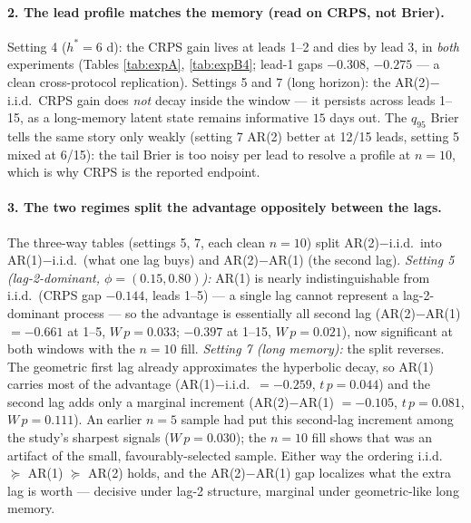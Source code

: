 \documentclass[11pt]{article}
\begin{document}
\paragraph{2. The lead profile matches the memory (read on CRPS, not Brier).}
Setting 4 ($h^\ast = 6$ d): the CRPS gain lives at leads 1--2 and dies by
lead 3, in \emph{both} experiments (Tables \ref{tab:expA}, \ref{tab:expB4};
lead-1 gaps $-0.308$, $-0.275$ --- a clean cross-protocol replication).
Settings 5 and 7 (long horizon): the AR(2)$-$i.i.d.\ CRPS gain does \emph{not}
decay inside the window --- it persists across leads 1--15, as a long-memory
latent state remains informative $15$ days out. The $q_{95}$ Brier tells the
same story only weakly (setting 7 AR(2) better at 12/15 leads, setting 5 mixed
at 6/15): the tail Brier is too noisy per lead to resolve a profile at
$n = 10$, which is why CRPS is the reported endpoint.

\paragraph{3. The two regimes split the advantage oppositely between the
lags.} The three-way tables (settings 5, 7, each clean $n = 10$) split
AR(2)$-$i.i.d.\ into AR(1)$-$i.i.d.\ (what one lag buys) and AR(2)$-$AR(1)
(the second lag). \emph{Setting 5 (lag-2-dominant, $\phi = (0.15, 0.80)$):}
AR(1) is nearly indistinguishable from i.i.d.\ (CRPS gap $-0.144$, leads
1--5) --- a single lag cannot represent a lag-2-dominant process --- so the
advantage is essentially all second lag (AR(2)$-$AR(1) $= -0.661$ at 1--5,
$W\,p = 0.033$; $-0.397$ at 1--15, $W\,p = 0.021$), now significant at both
windows with the $n = 10$ fill. \emph{Setting 7 (long memory):} the split
reverses. The geometric first lag already approximates the hyperbolic decay,
so AR(1) carries most of the advantage (AR(1)$-$i.i.d.\ $= -0.259$,
$t\,p = 0.044$) and the second lag adds only a marginal increment
(AR(2)$-$AR(1) $= -0.105$, $t\,p = 0.081$, $W\,p = 0.111$). An earlier $n = 5$
sample had put this second-lag increment among the study's sharpest signals
($W\,p = 0.030$); the $n = 10$ fill shows that was an artifact of the small,
favourably-selected sample. Either way the ordering i.i.d.\ $\succeq$ AR(1)
$\succeq$ AR(2) holds, and the AR(2)$-$AR(1) gap localizes what the extra lag
is worth --- decisive under lag-2 structure, marginal under geometric-like
long memory.
\end{document}

